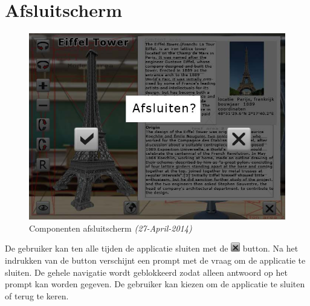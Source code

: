 \newpage
\section{Afsluitscherm} \label{sec:exitscherm}
\begin{figure}[h]
  \includegraphics[width=130mm]{figs/components3.jpg}
  \caption{Componenten afsluitscherm \textit{(27-April-2014)}}
  \label{fig:components3}
\end{figure}
De gebruiker kan ten alle tijden de applicatie sluiten met de \includegraphics[width=15px]{figs/button9.png} button. Na het indrukken van de button verschijnt een prompt met de vraag om de applicatie te sluiten. De gehele navigatie wordt geblokkeerd zodat alleen antwoord op het prompt kan worden gegeven. De gebruiker kan kiezen om de applicatie te sluiten of terug te keren.